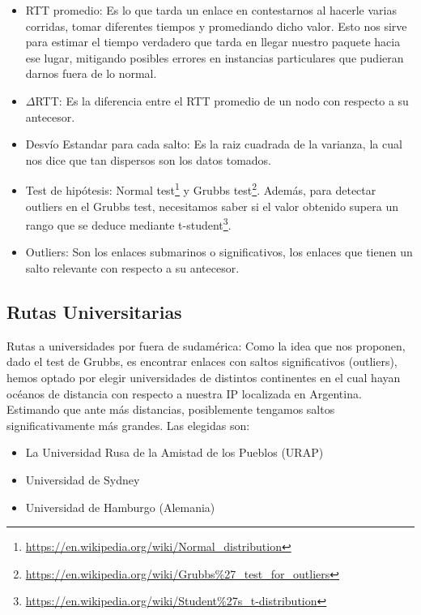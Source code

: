 \begin{itemize}

\item RTT promedio: Es lo que tarda un enlace en contestarnos al hacerle varias corridas, tomar diferentes tiempos y promediando dicho valor. Esto nos sirve para estimar el tiempo verdadero que tarda en llegar nuestro paquete hacia ese lugar, mitigando posibles errores en instancias particulares que pudieran darnos fuera de lo normal.

\item $\Delta$RTT: Es la diferencia entre el RTT promedio de un nodo con respecto a su antecesor.

\item Desv\'io Estandar para cada salto: Es la raiz cuadrada de la varianza, la cual nos dice que tan dispersos son los datos tomados.

\item Test de hip\'otesis: Normal test\footnote{\url{https://en.wikipedia.org/wiki/Normal_distribution}} y Grubbs test\footnote{\url{https://en.wikipedia.org/wiki/Grubbs\%27_test_for_outliers}}. Adem\'as, para detectar outliers en el Grubbs test, necesitamos saber si el valor obtenido supera un rango que se deduce mediante t-student\footnote{\url{https://en.wikipedia.org/wiki/Student\%27s_t-distribution}}.

\item Outliers: Son los enlaces submarinos o significativos, los enlaces que tienen un salto relevante con respecto a su antecesor.

\end{itemize}

\subsection{Rutas Universitarias} 

Rutas a universidades por fuera de sudam\'erica: Como la idea que nos proponen, dado el test de Grubbs, es encontrar enlaces con saltos significativos (outliers), hemos optado por elegir universidades de distintos continentes en el cual hayan oc\'eanos de distancia con respecto a nuestra IP localizada en Argentina. Estimando que ante m\'as distancias, posiblemente tengamos saltos significativamente m\'as grandes. Las elegidas son:

\begin{itemize}
\item La Universidad Rusa de la Amistad de los Pueblos (URAP)
\item Universidad de Sydney
\item Universidad de Hamburgo (Alemania)
\end{itemize}
